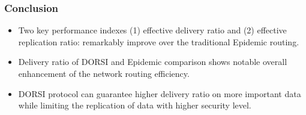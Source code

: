 \documentclass{beamer}
\begin{document}
\begin{frame}
	\frametitle{Conclusion}
	\begin{itemize}
		\item Two key performance indexes (1) effective delivery ratio and (2) effective replication ratio: remarkably improve over the traditional Epidemic routing. 
		\item Delivery ratio of DORSI and Epidemic comparison shows notable overall enhancement of the network routing efficiency. \item DORSI protocol can guarantee higher delivery ratio on more important data while limiting the replication of data with higher security level. 
		
	\end{itemize}
	
\end{frame}
\end{document}
